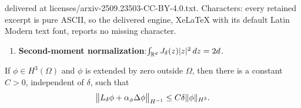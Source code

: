 \documentclass[10pt,a4paper]{amsart}
\DeclarePairedDelimiter{\abs}{\lvert}{\rvert}
\DeclarePairedDelimiter{\norm}{\lVert}{\rVert}
\newcommand{\dz}{\,\textup{d}z}
\begin{document}
delivered at licenses/arxiv-2509.23503-CC-BY-4.0.txt. Characters: every retained excerpt is pure ASCII, so the delivered engine, XeLaTeX with its default Latin Modern text font, reports no missing character.
	\begin{enumerate}[label=(J\arabic*), ref=J\arabic*, start=5, leftmargin=.9cm] 
		\item \textbf{Second-moment normalization}:$
		\int_{\mathbb{R}^d} J_\delta(z)\abs{z}^2  \dz = 2d$. \label{assump:2ndnorm}
	\end{enumerate}

\begin{lemma}\label{lem:dual_norm}
	If $\phi\in H^3(\Omega)$ and $\phi$ is extended by zero outside $\Omega$, then there is a constant $C>0$, independent of $\delta$, such that
	\[
	\bigl\|L_\delta\phi + \alpha_\phi\Delta\phi\bigr\|_{H^{-1}}
	\le C\delta\norm{\phi}_{H^3}.
	\]
\end{lemma}
\end{document}
